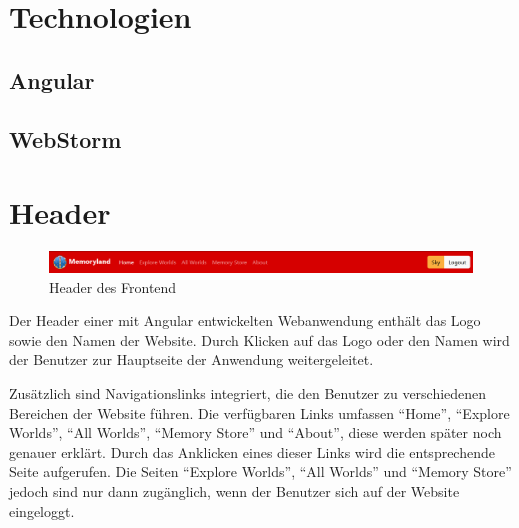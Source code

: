 
\section{Technologien}

\subsection{Angular}

\subsection{WebStorm}


\section{Header}

\begin{figure} [h t]
    \centering
    \includegraphics[scale=0.5]{pics/header_login.PNG}
    \caption{Header des Frontend}
    \label{fig:header-frontend}
\end{figure}

Der Header einer mit Angular entwickelten Webanwendung enthält das Logo sowie 
den Namen der Website. Durch Klicken auf das Logo oder den Namen wird der 
Benutzer zur Hauptseite der Anwendung weitergeleitet.

Zusätzlich sind Navigationslinks integriert, die den Benutzer zu verschiedenen 
Bereichen der Website führen. Die verfügbaren Links umfassen ``Home'', ``Explore 
Worlds'', ``All Worlds'', ``Memory Store'' und ``About'', diese werden später noch 
genauer erklärt. Durch das Anklicken eines dieser Links wird die entsprechende 
Seite aufgerufen. Die Seiten ``Explore Worlds'', ``All Worlds'' und ``Memory Store'' 
jedoch sind nur dann zugänglich, wenn der Benutzer sich auf der Website 
eingeloggt.


